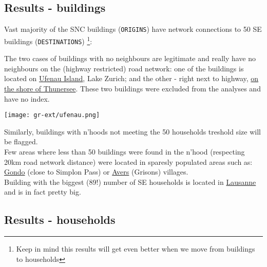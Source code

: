 \documentclass[a4paper, notitlepage, fleqn]{article} %
\begin{document}
\subsection{Results - buildings}

Vast majority of the SNC buildings (\texttt{ORIGINS}) have network connections to 50 SE buildings (\texttt{DESTINATIONS})
\footnote{Keep in mind this results will get even better when we move from buildings to households}: 
\begin{stlog}\end{stlog}
The two cases of buildings with no neighbours are legitimate and really have no neighbours on the (highway restricted) road network: 
	one of the buildings is located on \href{https://goo.gl/maps/L5sLmrMXZap}{Ufenau Island}, Lake Zurich; 
	and the other - right next to highway,  \href{https://goo.gl/maps/fxPCBS5TmEQ2}{on the shore of Thunersee}. 
	These two buildings were excluded from the analyses and have no index. \\
	
\begin{center}
\texttt{[image: gr-ext/ufenau.png]} 
\end{center}

Similarly, buildings with n'hoods not meeting the 50 households treshold size will be flagged. \\

Few areas where less than 50 buildings were found in the n'hood (respecting 20km road network distance) were located in sparesly populated areas such as:
	\href{https://goo.gl/maps/BXbgyCYtuGU2}{Gondo} (close to Simplon Pass) or \href{https://goo.gl/maps/mg15ptJPVTJ2}{Avers} (Grisons) villages. \\

Building with the biggest (89!) number of SE households is located in \href{https://goo.gl/maps/oFeag8mQFdS2}{Lausanne} and is in fact pretty big.
\subsection{Results - households}
\end{document}
